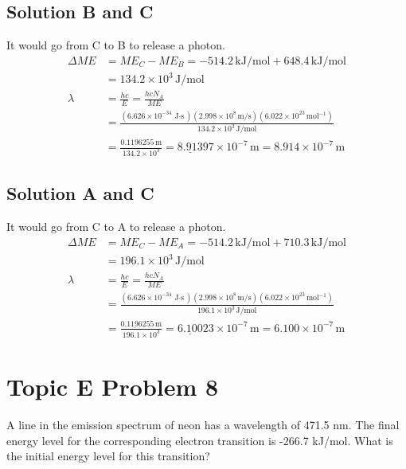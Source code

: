 \documentclass[10pt]{article}
\newcommand{\E}[1]{\times 10^{#1}}
\newcommand{\U}[1]{\underline{#1}}
\begin{document}
        \subsection{Solution B and C}
            It would go from C to B to release a photon.
            \begin{align}
                \Delta ME   &=  ME_C - ME_B
                    =   -514.2\,\unit{\kilo\joule/\mole} + 648.4\,\unit{\kilo\joule/\mole}\\
                    &=  134.2\E{3}\,\unit{\joule/\mole}\\
                \lambda &=  \frac{hc}{E}
                    =   \frac{hcN_A}{ME}\\
                    &=  \frac{(6.626\E{-34}\,\unit{\joule\cdot\second})(2.998\E{8}\,\unit{\meter/\second})(6.022\E{23}\,\unit{\mol^{-1}})}{134.2\E{3}\,\unit{\joule/\mole}}\\
                    &=  \frac{0.\U{1196}255\,\unit{\meter}}{134.2\E{3}}
                    =   \U{8.913}97\E{-7}\,\unit{\meter}
                    =   \boxed{8.914\E{-7}\,\unit{\meter}}
            \end{align}
        
        \subsection{Solution A and C}
            It would go from C to A to release a photon.
            \begin{align}
                \Delta ME   &=  ME_C - ME_A
                    =   -514.2\,\unit{\kilo\joule/\mole} + 710.3\,\unit{\kilo\joule/\mole}\\
                    &=  196.1\E{3}\,\unit{\joule/\mole}\\
                \lambda &=  \frac{hc}{E}
                    =   \frac{hcN_A}{ME}\\
                    &=  \frac{(6.626\E{-34}\,\unit{\joule\cdot\second})(2.998\E{8}\,\unit{\meter/\second})(6.022\E{23}\,\unit{\mol^{-1}})}{196.1\E{3}\,\unit{\joule/\mole}}\\
                    &=  \frac{0.\U{1196}255\,\unit{\meter}}{196.1\E{3}}
                    =   \U{6.100}23\E{-7}\,\unit{\meter}
                    =   \boxed{6.100\E{-7}\,\unit{\meter}}
            \end{align}


    \pagebreak
    \section{Topic E Problem 8}
        A line in the emission spectrum of neon has a wavelength of 471.5 nm. 
        The final energy level for the corresponding electron transition is -266.7 kJ/mol. 
        What is the initial energy level for this transition?
\end{document}
